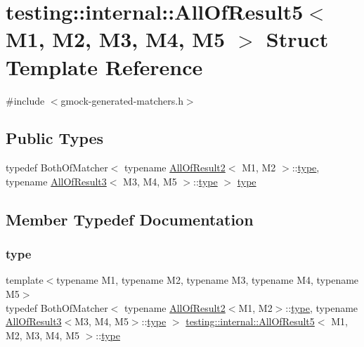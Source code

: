 \hypertarget{structtesting_1_1internal_1_1AllOfResult5}{}\section{testing\+::internal\+::All\+Of\+Result5$<$ M1, M2, M3, M4, M5 $>$ Struct Template Reference}
\label{structtesting_1_1internal_1_1AllOfResult5}


{\ttfamily \#include $<$gmock-\/generated-\/matchers.\+h$>$}

\subsection*{Public Types}
\begin{DoxyCompactItemize}
\item 
typedef Both\+Of\+Matcher$<$ typename \mbox{\hyperlink{structtesting_1_1internal_1_1AllOfResult2}{All\+Of\+Result2}}$<$ M1, M2 $>$\+::\mbox{\hyperlink{structtesting_1_1internal_1_1AllOfResult5_aee2e1fb803f428741d147347b692d108}{type}}, typename \mbox{\hyperlink{structtesting_1_1internal_1_1AllOfResult3}{All\+Of\+Result3}}$<$ M3, M4, M5 $>$\+::\mbox{\hyperlink{structtesting_1_1internal_1_1AllOfResult5_aee2e1fb803f428741d147347b692d108}{type}} $>$ \mbox{\hyperlink{structtesting_1_1internal_1_1AllOfResult5_aee2e1fb803f428741d147347b692d108}{type}}
\end{DoxyCompactItemize}


\subsection{Member Typedef Documentation}
\mbox{\label{structtesting_1_1internal_1_1AllOfResult5_aee2e1fb803f428741d147347b692d108}} 
\subsubsection{\texorpdfstring{type}{type}}
{\footnotesize\ttfamily template$<$typename M1, typename M2, typename M3, typename M4, typename M5$>$ \\
typedef Both\+Of\+Matcher$<$ typename \mbox{\hyperlink{structtesting_1_1internal_1_1AllOfResult2}{All\+Of\+Result2}}$<$M1, M2$>$\+::\mbox{\hyperlink{structtesting_1_1internal_1_1AllOfResult5_aee2e1fb803f428741d147347b692d108}{type}}, typename \mbox{\hyperlink{structtesting_1_1internal_1_1AllOfResult3}{All\+Of\+Result3}}$<$M3, M4, M5$>$\+::\mbox{\hyperlink{structtesting_1_1internal_1_1AllOfResult5_aee2e1fb803f428741d147347b692d108}{type}} $>$ \mbox{\hyperlink{structtesting_1_1internal_1_1AllOfResult5}{testing\+::internal\+::\+All\+Of\+Result5}}$<$ M1, M2, M3, M4, M5 $>$\+::\mbox{\hyperlink{structtesting_1_1internal_1_1AllOfResult5_aee2e1fb803f428741d147347b692d108}{type}}}




